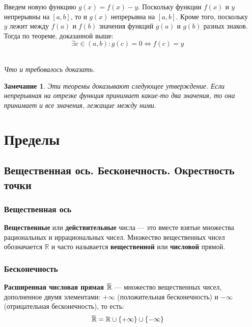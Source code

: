 \documentclass[a4paper,12pt,oneside]{extbook}
\newcommand{\newpar}{$ $\par\nobreak\ignorespaces}
\theoremstyle{numbered}
\theoremstyle{unnumbered}
\theoremstyle{named}
\theoremstyle{unnumbered}
\theoremstyle{named}
\theoremstyle{named}
\theoremstyle{named}
\newtheorem*{note}{Замечание}
\renewenvironment{proof}[1][]{\breakenv[Доказательство]{\if\relax\detokenize{#1}\relax\else\;\fi}{\textbf{#1}}}{\smallskip\newpar \hfill\textit{Что и требовалось доказать.}}
\newcommand{\overbar}[1]{\mkern 1.5mu\overline{\mkern0mu#1\mkern-1.5mu}\mkern 1.5mu}
\begin{document}
\begin{proof}
    Введем новую функцию \(g(x) = f(x) - y\). Поскольку функции \(f(x)\) и \(y\) непрерывны на \([a, b]\), то и \(g(x)\) непрерывна на \([a, b]\). Кроме того, поскольку \(y\) лежит между \(f(a)\) и \(f(b)\) значения функций \(g(a)\) и \(g(b)\) разных знаков. Тогда по теореме, доказанной выше:
    \[
        \exists c \in (a, b): g(c) = 0 \iff f(c) = y
    \]
\end{proof}

\begin{note}
    Эти теоремы доказывают следующее утверждение. Если непрерывная на отрезке функция принимает какие-то два значения, то она принимает и все значения, лежащие между ними.
\end{note}

\chapter{Пределы}%
\label{cha:Пределы}

\section{Вещественная ось. Бесконечность. Окрестность точки}%
\label{sec:Вещественная ось. Бесконечность. Окрестность точки}

\subsection{Вещественная ось}%
\label{sub:Вещественная ось}

\begin{siderules}
    \textbf{Вещественные} или \textbf{действительные} числа — это вместе взятые множества рациональных и иррациональных чисел. Множество вещественных чисел обозначается \(\mathbb{R}\) и часто называется \textbf{вещественной} или \textbf{числовой} прямой.
\end{siderules}


\subsection{Бесконечность}%
\label{sub:Бесконечность}

\begin{siderules}
    \textbf{Расширенная числовая прямая} \(\overbar{\mathbb{R}}\) — множество вещественных чисел, дополненное двумя элементами: \(+\infty\) (положительная бесконечность) и \(-\infty\) (отрицательная бесконечность), то есть:
    \[
        \overbar{\mathbb{R}} = \mathbb{R} \cup \{+\infty\} \cup \{-\infty\}
    \]
\end{siderules}
\end{document}
